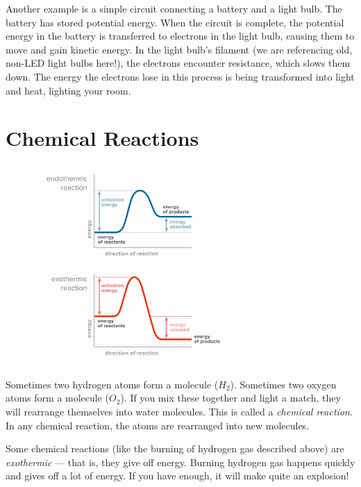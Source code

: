 Another example is a simple circuit connecting a battery and a light bulb. The 
battery has stored potential energy. When the circuit is complete, the potential 
energy in the battery is transferred to electrons in the light bulb, causing them 
to move and gain kinetic energy. In the light bulb's filament (we are referencing 
old, non-LED light bulbs here!), the electrons encounter resistance, which slows 
them down. The energy the electrons lose in this process is being transformed into 
light and heat, lighting your room. 




\section{Chemical Reactions}

\begin{figure}
\noindent\includegraphics[width=3in]{exo_endo_diagrams.png}
\caption{}
\label{fig:exo_endo_diagrams}
\end{figure}

Sometimes two hydrogen atoms form a molecule ($H_2$). Sometimes two oxygen
atoms form a molecule ($O_2$). If you mix these together and light a match,
they will rearrange themselves into water molecules. This is called a \textit{
chemical reaction}. In any chemical reaction, the atoms are rearranged into new
molecules.

Some chemical reactions (like the burning of hydrogen gas described above) are
\textit{exothermic} --- that is, they give off energy. Burning hydrogen gas
happens quickly and gives off a lot of energy. If you have enough, it will make
quite an explosion! 

